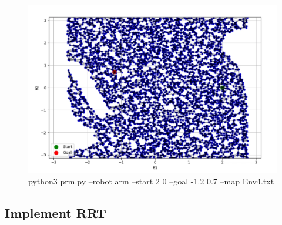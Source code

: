 \documentclass{article}
\begin{document}
\begin{figure} [H]
    \centering
    \includegraphics[width=0.7\linewidth]{latex_media/prm_arm_env4_conf2.png}
    \caption{python3 prm.py --robot arm --start 2 0 --goal -1.2 0.7 --map Env4.txt}
\end{figure}

\subsection{Implement RRT}
\end{document}
